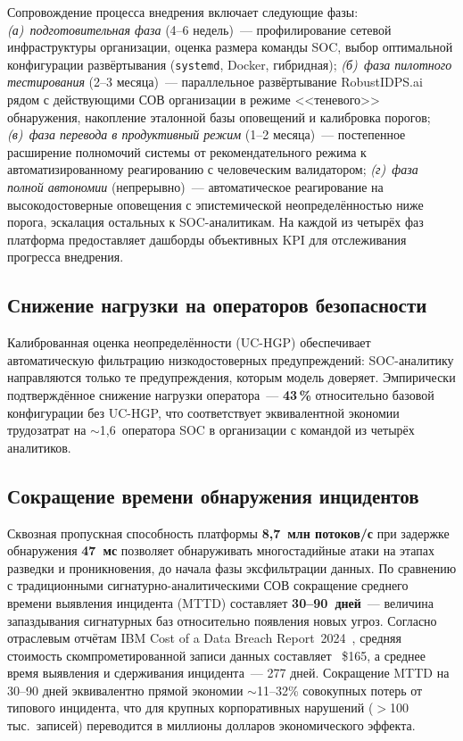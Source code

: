 Сопровождение процесса внедрения включает следующие фазы:
\emph{(а)~подготовительная фаза} (4--6 недель)~--- профилирование
сетевой инфраструктуры организации, оценка размера команды SOC,
выбор оптимальной конфигурации развёртывания (\texttt{systemd},
Docker, гибридная); \emph{(б)~фаза пилотного тестирования}
(2--3 месяца)~--- параллельное развёртывание \textsf{RobustIDPS.ai}
рядом с действующими СОВ организации в режиме <<теневого>>
обнаружения, накопление эталонной базы оповещений и калибровка
порогов; \emph{(в)~фаза перевода в продуктивный режим}
(1--2 месяца)~--- постепенное расширение полномочий системы от
рекомендательного режима к автоматизированному реагированию с
человеческим валидатором; \emph{(г)~фаза полной автономии}
(непрерывно)~--- автоматическое реагирование на высокодостоверные
оповещения с эпистемической неопределённостью ниже порога,
эскалация остальных к SOC-аналитикам. На каждой из четырёх фаз
платформа предоставляет дашборды объективных KPI для отслеживания
прогресса внедрения.

\subsection{Снижение нагрузки на операторов безопасности}

Калиброванная оценка неопределённости (UC-HGP) обеспечивает
автоматическую фильтрацию низкодостоверных предупреждений: SOC-аналитику
направляются только те предупреждения, которым модель доверяет.
Эмпирически подтверждённое снижение нагрузки оператора~--- \textbf{43\,\%}
относительно базовой конфигурации без UC-HGP, что соответствует
эквивалентной экономии трудозатрат на $\sim$1{,}6~оператора SOC в
организации с командой из четырёх аналитиков.

\subsection{Сокращение времени обнаружения инцидентов}

Сквозная пропускная способность платформы \textbf{8{,}7~млн потоков/с} при
задержке обнаружения \textbf{47~мс} позволяет обнаруживать многостадийные
атаки на этапах разведки и проникновения, до начала фазы эксфильтрации
данных. По сравнению с традиционными сигнатурно-аналитическими СОВ
сокращение среднего времени выявления инцидента (MTTD) составляет
\textbf{30--90~дней}~--- величина запаздывания сигнатурных баз относительно
появления новых угроз. Согласно отраслевым отчётам IBM Cost of a Data
Breach Report~2024~\cite{IBM2024}, средняя стоимость скомпрометированной
записи данных составляет ~\$165, а среднее время выявления и
сдерживания инцидента~--- 277 дней. Сокращение MTTD на 30--90 дней
эквивалентно прямой экономии $\sim$11--32\% совокупных потерь от
типового инцидента, что для крупных корпоративных нарушений
($>$100\,тыс.\ записей) переводится в миллионы долларов экономического
эффекта.

